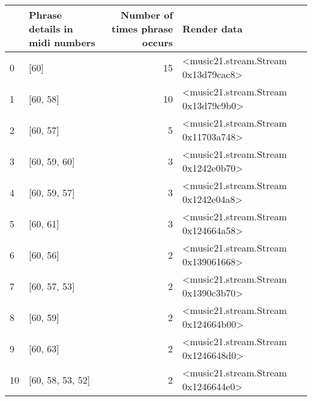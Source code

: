 \documentclass[11pt]{article}
\begin{document}
    \begin{tabular}{llrl}
\toprule
{} & Phrase details in midi numbers &  Number of times phrase occurs &                          Render data \\
\midrule
0  &  [60] &  15 &  <music21.stream.Stream 0x13d79cac8> \\
1  &  [60, 58] &  10 &  <music21.stream.Stream 0x13d79c9b0> \\
2  &  [60, 57] &  5 &  <music21.stream.Stream 0x11703a748> \\
3  &  [60, 59, 60] &  3 &  <music21.stream.Stream 0x1242e0b70> \\
4  &  [60, 59, 57] &  3 &  <music21.stream.Stream 0x1242e04a8> \\
5  &  [60, 61] &  3 &  <music21.stream.Stream 0x124664a58> \\
6  &  [60, 56] &  2 &  <music21.stream.Stream 0x139061668> \\
7  &  [60, 57, 53] &  2 &  <music21.stream.Stream 0x1390c3b70> \\
8  &  [60, 59] &  2 &  <music21.stream.Stream 0x124664b00> \\
9  &  [60, 63] &  2 &  <music21.stream.Stream 0x1246648d0> \\
10 &  [60, 58, 53, 52] &  2 &  <music21.stream.Stream 0x1246644e0> \\
\bottomrule
\end{tabular}

    
\end{document}
